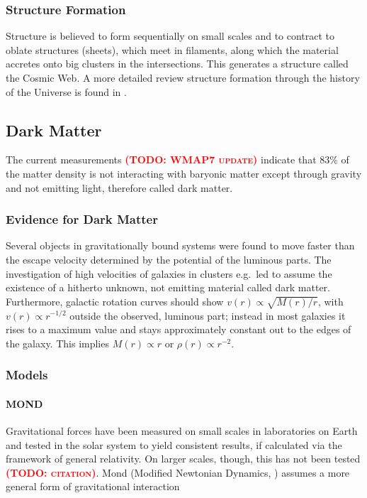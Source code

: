 \documentclass[useAMS,usenatbib]{mn2e}
\newcommand{\TODO}[1]{\textsc{\textbf{\textcolor{red}{(TODO: #1)}}}}
\begin{document}
\subsubsection{Structure Formation}
Structure is believed to form sequentially on small scales and to
contract to oblate structures (sheets), which meet in filaments, along
which the material accretes onto big clusters in the
intersections. This generates a structure called the Cosmic Web. A
more detailed review structure formation through the
history of the Universe is found in \cite{Padmanabhan1993}.

\subsection{Dark Matter}
The current measurements \citep{Komatsu2009} \TODO{WMAP7 update}
indicate that 83\% of the matter density is not interacting with
baryonic matter except through gravity and not emitting light,
therefore called dark matter.

\subsubsection{Evidence for Dark Matter}
Several objects in gravitationally bound systems were found to move
faster than the escape velocity determined by the potential of the
luminous parts. The investigation of high velocities of galaxies in
clusters e.g.\ led \cite{Zwicky1933} to assume the existence of a
hitherto unknown, not emitting material called {\sc dark
  matter}. Furthermore, galactic rotation curves should show
$v(r)\propto\sqrt{M(r)/r}$, with $v(r)\propto r^{-1/2}$ outside the
observed, luminous part; instead in most galaxies it rises to a
maximum value and stays approximately constant out to the edges of the
galaxy. This implies $M(r)\propto r$ or $\rho(r)\propto r^{-2}$.

\subsubsection{Models}
\paragraph{MOND}
Gravitational forces have been measured on small scales in
laboratories on Earth and tested in the solar system to
yield consistent results, if calculated via the framework of general
relativity. On larger scales, though, this has not been tested \TODO{citation}. {\sc
  Mond} (Modified Newtonian Dynamics, \cite{Milgrom1983}) assumes a
more general form of gravitational interaction
\end{document}
